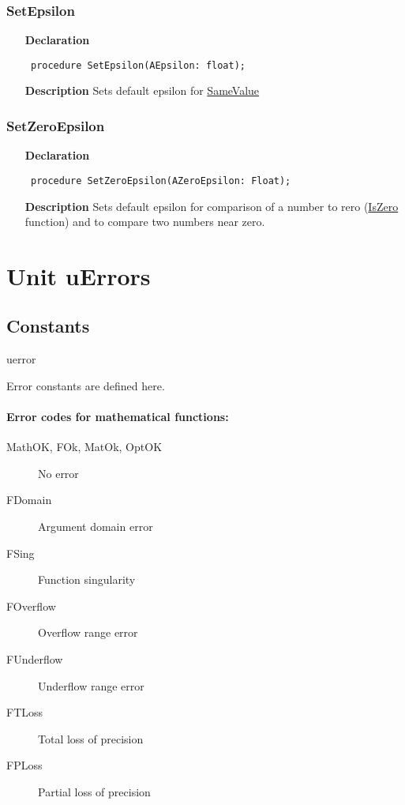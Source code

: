 \documentclass[12pt,a4paper,oneside]{report}
\newcommand{\lmath}[1]{   %
	\marginpar{\vspace{#1} 
		\begin{flushright}
			LMath
	\end{flushright} }
}
\newcommand{\declarationitem}[1]{\textbf{#1}}
\newcommand{\descriptiontitle}[1]{\textbf{#1}}
\newcommand{\code}[1]{\texttt{#1}}
\begin{document}
\subsubsection{SetEpsilon}\label{utypes-setepsilon}
\lmath{-24pt}
\begin{itemize}\item[\declarationitem{Declaration}\hfill]
	\begin{flushleft}
		\code{
			procedure SetEpsilon(AEpsilon: float);}
		
	\end{flushleft}
	\par
	\item[\descriptiontitle{Description}]
	Sets default epsilon for \hyperref[utypes-SameValue]{SameValue}
\end{itemize}
\subsubsection{SetZeroEpsilon}
\lmath{-24pt}
\label{utypes-SetZeroEpsilon}
\begin{itemize}\item[\declarationitem{Declaration}\hfill]
	\begin{flushleft}
		\code{
			procedure SetZeroEpsilon(AZeroEpsilon: Float);}
	\end{flushleft}
	\par
	\item[\descriptiontitle{Description}]
	Sets default epsilon for comparison of a number to rero (\hyperref[utypes-IsZero]{IsZero} function) and to compare two numbers near zero.
\end{itemize}

\section{Unit uErrors}
\subsection{Constants}
\label{uErrors}\hypertarget{genmath}{uerror}Error constants are defined here.

\paragraph{Error codes for mathematical functions:}
\begin{description}
	\item[MathOK, FOk, MatOk, OptOK] No error
	\item[FDomain] Argument domain error \label{uErrors-FDomain}
	\item[FSing] Function singularity \label{uErrors-FSing}
	\item[FOverflow] Overflow range error \label{uErrors-FOverflow}
	\item[FUnderflow] Underflow range error \label{uErrors-FUnderflow}
	\item[FTLoss] Total loss of precision \label{uErrors-FTLoss}
	\item[FPLoss] Partial loss of precision \label{uErrors-FPLoss}
\end{description}
\end{document}
